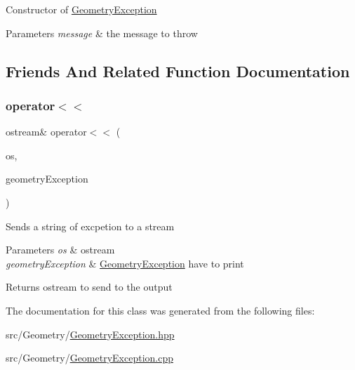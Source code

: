 Constructor of \hyperlink{class_geometry_exception}{Geometry\+Exception} 
\begin{DoxyParams}{Parameters}
{\em message} & the message to throw \\
\hline
\end{DoxyParams}


\subsection{Friends And Related Function Documentation}
\hypertarget{class_geometry_exception_a1a0e9b6dde275e9a72dd6538ab4a7b73}{}\label{class_geometry_exception_a1a0e9b6dde275e9a72dd6538ab4a7b73} 
\subsubsection{\texorpdfstring{operator$<$$<$}{operator<<}}
{\footnotesize\ttfamily ostream\& operator$<$$<$ (\begin{DoxyParamCaption}\item[{ostream \&}]{os,  }\item[{const \hyperlink{class_geometry_exception}{Geometry\+Exception} \&}]{geometry\+Exception }\end{DoxyParamCaption})\hspace{0.3cm}{\ttfamily [friend]}}

Sends a string of excpetion to a stream 
\begin{DoxyParams}{Parameters}
{\em os} & ostream \\
\hline
{\em geometry\+Exception} & \hyperlink{class_geometry_exception}{Geometry\+Exception} have to print \\
\hline
\end{DoxyParams}
\begin{DoxyReturn}{Returns}
ostream to send to the output 
\end{DoxyReturn}


The documentation for this class was generated from the following files\+:\begin{DoxyCompactItemize}
\item 
src/\+Geometry/\hyperlink{_geometry_exception_8hpp}{Geometry\+Exception.\+hpp}\item 
src/\+Geometry/\hyperlink{_geometry_exception_8cpp}{Geometry\+Exception.\+cpp}\end{DoxyCompactItemize}
